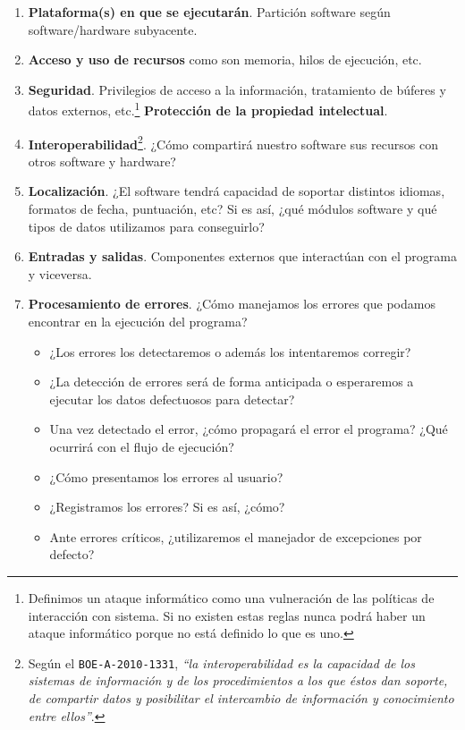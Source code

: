 \begin{enumerate}
    \item \textbf{Plataforma(s) en que se ejecutarán}. Partición software según software/hardware
          subyacente.
    \item \textbf{Acceso y uso de recursos} como son memoria, hilos de ejecución, etc.
    \item \textbf{Seguridad}. Privilegios de acceso a la información, tratamiento de búferes
          y datos externos, etc.\footnote{
            Definimos un ataque informático como una vulneración de las políticas de
            interacción con sistema. Si no existen estas reglas nunca podrá haber un
            ataque informático porque no está definido lo que es uno.
          } \textbf{Protección de la propiedad intelectual}.
    \item \textbf{Interoperabilidad}\footnote{Según el \texttt{BOE-A-2010-1331}, \textit{``la interoperabilidad
          es la capacidad de los sistemas de información y de los procedimientos a los que éstos dan soporte,
          de compartir datos y posibilitar el intercambio de información y conocimiento entre ellos''}.}. ¿Cómo compartirá nuestro software sus recursos con otros
          software y hardware?
    \item \textbf{Localización}. ¿El software tendrá capacidad de soportar distintos
          idiomas, formatos de fecha, puntuación, etc? Si es así, ¿qué módulos software y qué
          tipos de datos utilizamos para conseguirlo?
    \item \textbf{Entradas y salidas}. Componentes externos que interactúan con el programa y viceversa.
    \item \textbf{Procesamiento de errores}. ¿Cómo manejamos los errores que podamos encontrar en 
          la ejecución del programa?
        \begin{itemize}
            \item ¿Los errores los detectaremos o además los intentaremos corregir?
            \item ¿La detección de errores será de forma anticipada o esperaremos a ejecutar
                  los datos defectuosos para detectar?
            \item Una vez detectado el error, ¿cómo propagará el error el programa? ¿Qué ocurrirá
                  con el flujo de ejecución?
            \item ¿Cómo presentamos los errores al usuario?
            \item ¿Registramos los errores? Si es así, ¿cómo?
            \item Ante errores críticos, ¿utilizaremos el manejador de excepciones por defecto?
        \end{itemize}
\end{enumerate}

